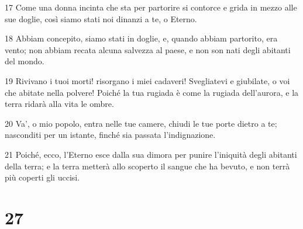 \par 17 Come una donna incinta che sta per partorire si contorce e grida in mezzo alle sue doglie, così siamo stati noi dinanzi a te, o Eterno.
\par 18 Abbiam concepito, siamo stati in doglie, e, quando abbiam partorito, era vento; non abbiam recata alcuna salvezza al paese, e non son nati degli abitanti del mondo.
\par 19 Rivivano i tuoi morti! risorgano i miei cadaveri! Svegliatevi e giubilate, o voi che abitate nella polvere! Poiché la tua rugiada è come la rugiada dell'aurora, e la terra ridarà alla vita le ombre.
\par 20 Va', o mio popolo, entra nelle tue camere, chiudi le tue porte dietro a te; nasconditi per un istante, finché sia passata l'indignazione.
\par 21 Poiché, ecco, l'Eterno esce dalla sua dimora per punire l'iniquità degli abitanti della terra; e la terra metterà allo scoperto il sangue che ha bevuto, e non terrà più coperti gli uccisi.

\chapter{27}

